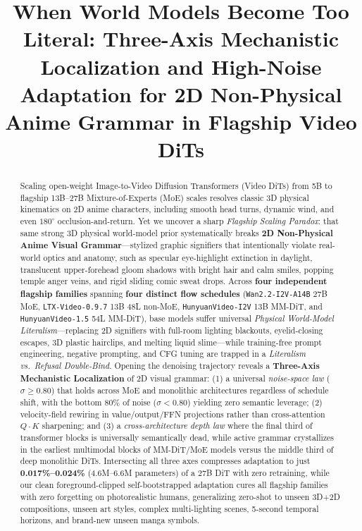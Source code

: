 \documentclass[10pt,twocolumn,letterpaper]{article}
\title{When World Models Become Too Literal: Three-Axis Mechanistic Localization and High-Noise Adaptation for 2D Non-Physical Anime Grammar in Flagship Video DiTs}
\begin{document}
\maketitle

\begin{abstract}
Scaling open-weight Image-to-Video Diffusion Transformers (Video DiTs) from 5B to flagship 13B--27B Mixture-of-Experts (MoE) scales resolves classic 3D physical kinematics on 2D anime characters, including smooth head turns, dynamic wind, and even $180^\circ$ occlusion-and-return. Yet we uncover a sharp \emph{Flagship Scaling Paradox}: that same strong 3D physical world-model prior systematically breaks \textbf{2D Non-Physical Anime Visual Grammar}---stylized graphic signifiers that intentionally violate real-world optics and anatomy, such as specular eye-highlight extinction in daylight, translucent upper-forehead gloom shadows with bright hair and calm smiles, popping temple anger veins, and rigid sliding comic sweat drops. Across \textbf{four independent flagship families} spanning \textbf{four distinct flow schedules} (\texttt{Wan2.2-I2V-A14B} 27B MoE, \texttt{LTX-Video-0.9.7} 13B 48L non-MoE, \texttt{HunyuanVideo-I2V} 13B MM-DiT, and \texttt{HunyuanVideo-1.5} 54L MM-DiT), base models suffer universal \emph{Physical World-Model Literalism}---replacing 2D signifiers with full-room lighting blackouts, eyelid-closing escapes, 3D plastic hairclips, and melting liquid slime---while training-free prompt engineering, negative prompting, and CFG tuning are trapped in a \emph{Literalism vs.\ Refusal Double-Bind}. Opening the denoising trajectory reveals a \textbf{Three-Axis Mechanistic Localization} of 2D visual grammar: (1) a universal \emph{noise-space law} ($\sigma \ge 0.80$) that holds across MoE and monolithic architectures regardless of schedule shift, with the bottom 80\% of noise ($\sigma < 0.80$) yielding zero semantic leverage; (2) velocity-field rewiring in value/output/FFN projections rather than cross-attention $Q\cdot K$ sharpening; and (3) a \emph{cross-architecture depth law} where the final third of transformer blocks is universally semantically dead, while active grammar crystallizes in the earliest multimodal blocks of MM-DiT/MoE models versus the middle third of deep monolithic DiTs. Intersecting all three axes compresses adaptation to just \textbf{0.017\%--0.024\%} (4.6M--6.6M parameters) of a 27B DiT with zero retraining, while our clean foreground-clipped self-bootstrapped adaptation cures all flagship families with zero forgetting on photorealistic humans, generalizing zero-shot to unseen 3D+2D compositions, unseen art styles, complex multi-lighting scenes, 5-second temporal horizons, and brand-new unseen manga symbols.
\end{abstract}
\end{document}
